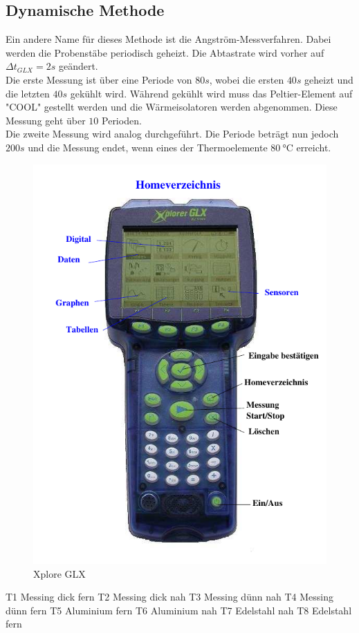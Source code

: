 \subsection{Dynamische Methode}
\label{subsec:durch_dyn}
Ein andere Name für dieses Methode ist die Angström-Messverfahren.
Dabei werden die Probenstäbe periodisch geheizt.
Die Abtastrate wird vorher auf $\Delta t_{GLX} = 2\si{s}$ geändert.\\
Die erste Messung ist über eine Periode von $80\si{s}$, wobei die ersten $40\si{s}$ geheizt und die letzten $40\si{s}$ gekühlt wird.
Während gekühlt wird muss das Peltier-Element auf "COOL" gestellt werden und die Wärmeisolatoren werden abgenommen.
Diese Messung geht über $10$ Perioden.\\
Die zweite Messung wird analog durchgeführt. 
Die Periode beträgt nun jedoch $200 \si{s}$ und die Messung endet, wenn eines der Thermoelemente $\qty{80}{\degreeCelsius}$ erreicht.

\begin{figure}[H]
    \centering
    \includegraphics{content/Abb_2.pdf}
    \caption{Xplore GLX\cite[5]{V204}}
    \label{fig:GLX}
\end{figure}

T1 Messing dick fern
T2 Messing dick nah
T3 Messing dünn nah 
T4 Messing dünn fern
T5 Aluminium fern
T6 Aluminium nah
T7 Edelstahl nah
T8 Edelstahl fern